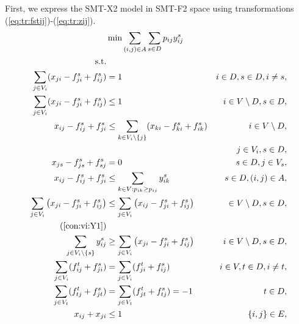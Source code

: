 First, we express the SMT-X2 model in SMT-F2 space using transformations (\ref{eq:tr:fstij})-(\ref{eq:tr:zij}). 
\begin{subequations}
\begin{flalign}
\label{objective:mfinpf2} &\makebox[0pt][l]{$\displaystyle{}\min \sum\limits_{(i,j) \in A} \sum\limits_{s \in D} p_{ij} y^s_{ij} $} & \\ 
\notag\text{s.t.}& & \\
\label{con:mfinpf2:arrowFromDest} \sum\limits_{j\in V_i}(x_{ji}-f^s_{ji}+f^s_{ij}) & = 1 & i\in D, s\in D, i \neq s,\\ 
\label{con:mfinpf2:arrowFromNonDestB} \sum\limits_{j \in V_i}(x_{ji}-f^s_{ji}+f^s_{ij}) &\leq 1 & i\in V \setminus D, s\in D,\\
\label{con:mfinpf2:arrowFromNonDestA} x_{ij}-f^s_{ij}+f^s_{ji}  & \leq \sum\limits_{k \in V_i\setminus\{j\}}(x_{ki}-f^s_{ki}+f^s_{ik}) & i\in V \setminus D,\\
\notag & & j\in V_i, s\in D,\\
\label{con:mfinpf2:startInSource} x_{js} - f^s_{js}+f^s_{sj} & = 0 & s\in D, j\in V_s,\\
\label{con:mfinpf2:yvar} x_{ij}-f^s_{ij}+f^s_{ji} & \leq \sum\limits_{k\in V:p_{ik}\geq p_{ij}}y^s_{ik} & s\in D, (i,j)\in A,\\ 
\label{con:mfinpf2:extraCon} \sum\limits_{j\in V_{i}}\left(x_{ji}-f^s_{ji}+f^s_{ij}\right) & \leq \sum\limits_{j\in V_{i}}\left(x_{ij}-f^s_{ji}+f^s_{ij}\right)  &\in V\setminus D, s\in D,\\
\notag\text(\ref{con:vi:Y1}) & &\\
\label{con:mfinpf2:sumYImpSumXTrans} \sum\limits_{j\in V_i\setminus\{s\} }y^{s}_{ij} & \geq \sum\limits_{j\in V_i} \left( x_{ji}-f^s_{ji}+f^s_{ij} \right) &  i\in V\setminus D, s\in D,\\ 
\label{con:mfinpf2:flowNormal}  \sum\limits_{\substack{ j\in V_i }}(f^t_{ij}+f^s_{ji})&=\sum\limits_{\substack{j\in V_i }}(f^t_{ji}+f^s_{ij}) & i\in V, t\in D, i \neq t,\\
\label{con:mfinpf2:flowDest}  \sum\limits_{\substack{j\in V_t}}(f^t_{tj}+f^s_{jt})&=\sum\limits_{\substack{j\in V_t}}(f^t_{jt}+f^s_{tj})  = -1  &  t \in D,\\
\label{con:mfinpf2:zbound} x_{ij}+x_{ji}&\leq 1 & \{i,j\}\in E, \\

\end{flalign}
\end{subequations}
